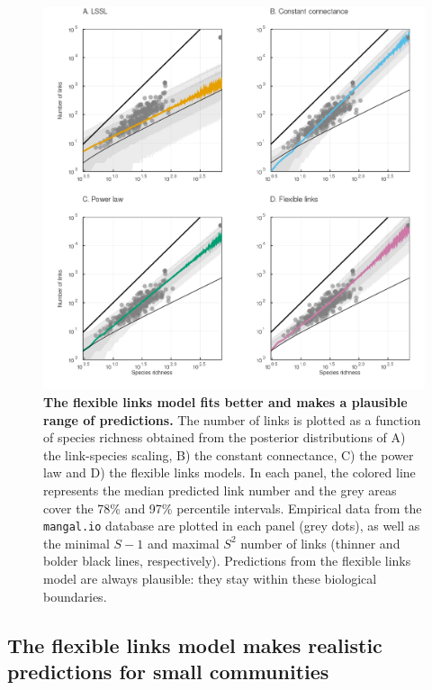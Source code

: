 \documentclass[12pt]{article}
\begin{document}
\begin{figure}
\hypertarget{fig:PP_counterfactual}{%
\centering
\includegraphics{figures/models_links.png}
\caption{\textbf{The flexible links model fits better and makes a
plausible range of predictions.} The number of links is plotted as a
function of species richness obtained from the posterior distributions
of A) the link-species scaling, B) the constant connectance, C) the
power law and D) the flexible links models. In each panel, the colored
line represents the median predicted link number and the grey areas
cover the 78\% and 97\% percentile intervals. Empirical data from the
\texttt{mangal.io} database are plotted in each panel (grey dots), as
well as the minimal \(S-1\) and maximal \(S^2\) number of links (thinner
and bolder black lines, respectively). Predictions from the flexible
links model are always plausible: they stay within these biological
boundaries.}\label{fig:PP_counterfactual}
}
\end{figure}

\hypertarget{the-flexible-links-model-makes-realistic-predictions-for-small-communities}{%
\subsection{The flexible links model makes realistic predictions for
small
communities}\label{the-flexible-links-model-makes-realistic-predictions-for-small-communities}}
\end{document}
